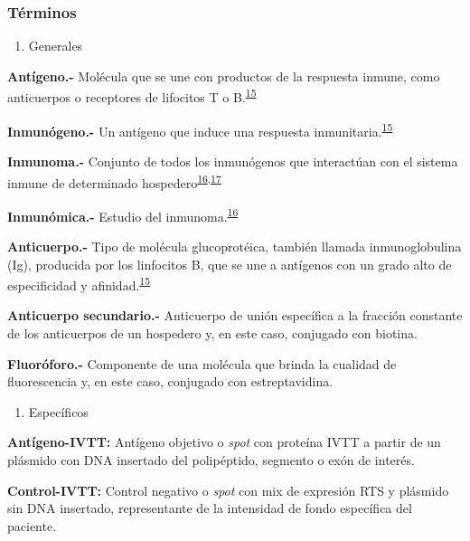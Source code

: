 \documentclass[]{article}
\providecommand{\tightlist}{%
  \setlength{\itemsep}{0pt}\setlength{\parskip}{0pt}}
\begin{document}
\subsubsection{Términos}\label{terminos}

\begin{enumerate}
\def\labelenumi{\alph{enumi}.}
\tightlist
\item
  Generales
\end{enumerate}

\textbf{Antígeno.-} Molécula que se une con productos de la respuesta
inmune, como anticuerpos o receptores de lifocitos T o
B.\textsuperscript{\protect\hyperlink{ref-abbas2012}{15}}

\textbf{Inmunógeno.-} Un antígeno que induce una respuesta
inmunitaria.\textsuperscript{\protect\hyperlink{ref-abbas2012}{15}}

\textbf{Inmunoma.-} Conjunto de todos los inmunógenos que interactúan
con el sistema inmune de determinado
hospedero\textsuperscript{\protect\hyperlink{ref-immunomics2016}{16},\protect\hyperlink{ref-sette2005}{17}}

\textbf{Inmunómica.-} Estudio del
inmunoma.\textsuperscript{\protect\hyperlink{ref-immunomics2016}{16}}

\textbf{Anticuerpo.-} Tipo de molécula glucoprotéica, también llamada
inmunoglobulina (Ig), producida por los linfocitos B, que se une a
antígenos con un grado alto de especificidad y
afinidad.\textsuperscript{\protect\hyperlink{ref-abbas2012}{15}}

\textbf{Anticuerpo secundario.-} Anticuerpo de unión específica a la
fracción constante de los anticuerpos de un hospedero y, en este caso,
conjugado con biotina.

\textbf{Fluoróforo.-} Componente de una molécula que brinda la cualidad
de fluorescencia y, en este caso, conjugado con estreptavidina.

\begin{enumerate}
\def\labelenumi{\alph{enumi}.}
\setcounter{enumi}{1}
\tightlist
\item
  Específicos
\end{enumerate}

\textbf{Antígeno-IVTT:} Antígeno objetivo o \emph{spot} con proteína
IVTT a partir de un plásmido con DNA insertado del polipéptido, segmento
o exón de interés.

\textbf{Control-IVTT:} Control negativo o \emph{spot} con mix de
expresión RTS y plásmido sin DNA insertado, representante de la
intensidad de fondo específica del paciente.
\end{document}
